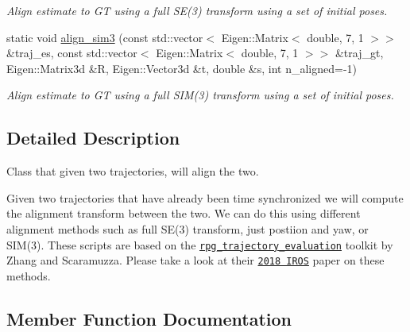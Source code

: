 \begin{DoxyCompactItemize}
\begin{DoxyCompactList}\small\item\em Align estimate to GT using a full S\+E(3) transform using a set of initial poses. \end{DoxyCompactList}\item 
static void \hyperlink{classov__eval_1_1AlignTrajectory_a0413904b252f558fe47886cbbf772e63}{align\+\_\+sim3} (const std\+::vector$<$ Eigen\+::\+Matrix$<$ double, 7, 1 $>$$>$ \&traj\+\_\+es, const std\+::vector$<$ Eigen\+::\+Matrix$<$ double, 7, 1 $>$$>$ \&traj\+\_\+gt, Eigen\+::\+Matrix3d \&R, Eigen\+::\+Vector3d \&t, double \&s, int n\+\_\+aligned=-\/1)
\begin{DoxyCompactList}\small\item\em Align estimate to GT using a full S\+I\+M(3) transform using a set of initial poses. \end{DoxyCompactList}\end{DoxyCompactItemize}


\subsection{Detailed Description}
Class that given two trajectories, will align the two. 

Given two trajectories that have already been time synchronized we will compute the alignment transform between the two. We can do this using different alignment methods such as full S\+E(3) transform, just postiion and yaw, or S\+I\+M(3). These scripts are based on the \href{https://github.com/uzh-rpg/rpg_trajectory_evaluation}{\tt rpg\+\_\+trajectory\+\_\+evaluation} toolkit by Zhang and Scaramuzza. Please take a look at their \href{http://rpg.ifi.uzh.ch/docs/IROS18_Zhang.pdf}{\tt 2018 I\+R\+OS} paper on these methods. 

\subsection{Member Function Documentation}
\mbox{\label{classov__eval_1_1AlignTrajectory_aea1c35dee4b15301c7248c1698ee4ffa}} 

